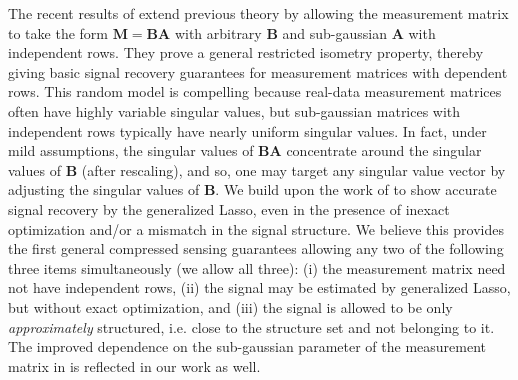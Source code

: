 \documentclass{article}
\begin{document}
The recent results of \cite{jeong2020subgaussian} extend previous theory by allowing the measurement matrix to take the form $\mathbf{M} = \mathbf{B}\mathbf{A}$ with arbitrary $\mathbf{B}$ and sub-gaussian $\mathbf{A}$ with independent rows.  They prove a general restricted isometry property,    
%
%
thereby giving basic signal recovery guarantees for measurement matrices with dependent rows.  This random model is compelling because real-data measurement matrices often have highly variable singular values, but sub-gaussian matrices with independent rows typically have nearly uniform singular values.  In fact, under mild assumptions, the singular values of $\mathbf{B A}$ concentrate around the singular values of $\mathbf{B}$ (after rescaling), and so, one may target any singular value vector by adjusting the singular values of $\mathbf{B}$.
We build upon the work of \cite{jeong2020subgaussian} to show accurate signal recovery by the generalized Lasso, even in the presence of inexact optimization and/or a mismatch in the signal structure. We believe this provides the first general compressed sensing guarantees allowing any two of the following three items simultaneously (we allow all three): (i) the measurement matrix need not have independent rows, (ii) the signal may be estimated by generalized Lasso, but without exact optimization, and (iii) the signal is allowed to be only \textit{approximately} structured, i.e. close to the structure set and not belonging to it.  The improved dependence on the sub-gaussian parameter of the measurement matrix in \cite{jeong2020subgaussian} is reflected in our work as well.
\end{document}
